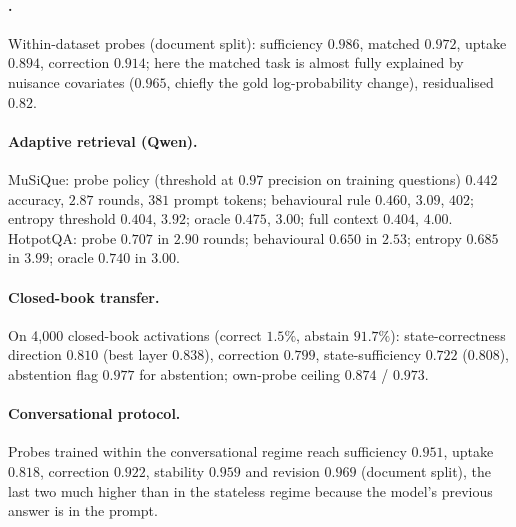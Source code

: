 \paragraph{\twowiki{}.} Within-dataset probes (document split): sufficiency $0.986$, matched $0.972$, uptake $0.894$, correction $0.914$; here the matched task is almost fully explained by nuisance covariates ($0.965$, chiefly the gold log-probability change), residualised $0.82$.

\paragraph{Adaptive retrieval (Qwen).} MuSiQue: probe policy (threshold at $0.97$ precision on training questions) $0.442$ accuracy, $2.87$ rounds, $381$ prompt tokens; behavioural rule $0.460$, $3.09$, $402$; entropy threshold $0.404$, $3.92$; oracle $0.475$, $3.00$; full context $0.404$, $4.00$. HotpotQA: probe $0.707$ in $2.90$ rounds; behavioural $0.650$ in $2.53$; entropy $0.685$ in $3.99$; oracle $0.740$ in $3.00$.

\paragraph{Closed-book transfer.} On 4{,}000 closed-book activations (correct $1.5\%$, abstain $91.7\%$): state-correctness direction $0.810$ (best layer $0.838$), correction $0.799$, state-sufficiency $0.722$ ($0.808$), abstention flag $0.977$ for abstention; own-probe ceiling $0.874$ / $0.973$.

\paragraph{Conversational protocol.} Probes trained within the conversational regime reach sufficiency $0.951$, uptake $0.818$, correction $0.922$, stability $0.959$ and revision $0.969$ (document split), the last two much higher than in the stateless regime because the model's previous answer is in the prompt.
